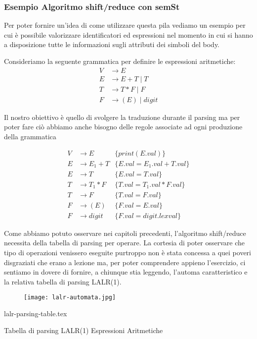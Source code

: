 \documentclass[class=book, crop=false, oneside, 12pt]{standalone}
\begin{document}
\subsubsection{Esempio Algoritmo shift/reduce con semSt}

Per poter fornire un'idea di come utilizzare questa pila vediamo un esempio per cui è possibile valorizzare identificatori ed espressioni nel momento in cui si hanno a disposizione tutte le informazioni sugli attributi dei simboli del body. 

Consideriamo la seguente grammatica per definire le espressioni aritmetiche:
\begin{align*}
    V &\to E \\
    E &\to E + T \mid T \\
    T &\to T * F \mid F \\
    F &\to (E) \mid digit
\end{align*}

Il nostro obiettivo è quello di svolgere la traduzione durante il parsing ma per poter fare ciò abbiamo anche bisogno delle regole associate ad ogni produzione della grammatica

\begin{align*}
    V &\to E &\{print(E.val)\} \\
    E &\to E_1 + T &\{E.val = E_1.val + T.val\} \\
    E &\to T &\{E.val = T.val\} \\
    T &\to T_1 * F &\{T.val = T_1.val * F.val\} \\
    T &\to F &\{T.val = F.val\} \\
    F &\to (E) &\{F.val = E.val\} \\
    F &\to digit &\{F.val = digit.lexval\}
\end{align*}

Come abbiamo potuto osservare nei capitoli precedenti, l'algoritmo shift/reduce necessita della tabella di parsing per operare. La cortesia di poter osservare che tipo di operazioni venissero eseguite purtroppo non è stata concessa a quei poveri disgraziati che erano a lezione ma, per poter comprendere appieno l'esercizio, ci sentiamo in dovere di fornire, a chiunque stia leggendo, l'automa caratteristico e la relativa tabella di parsing LALR(1).

\begin{figure}[H]
    \centering
    \texttt{[image: lalr-automata.jpg]}
\end{figure}

\begin{table}[H]
    \centering
    {lalr-parsing-table.tex}
    \caption{Tabella di parsing LALR(1) Espressioni Aritmetiche}
    \label{tab:lalr-parsing-table}
\end{table}
\end{document}
